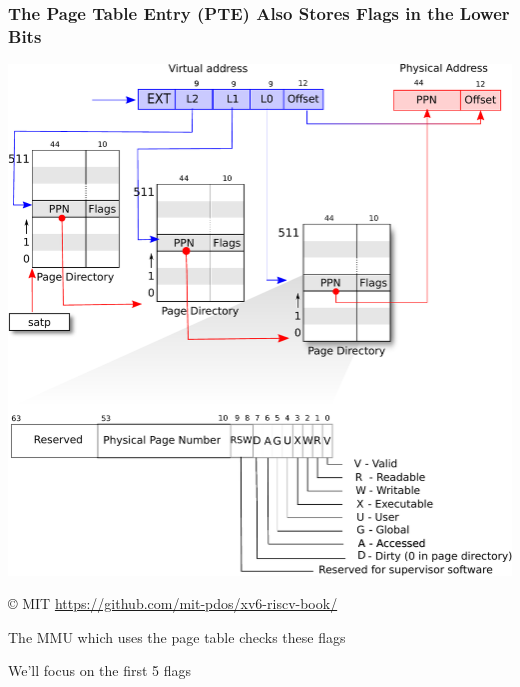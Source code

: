   \begin{frame}
    \frametitle{The Page Table Entry (PTE) Also Stores Flags in the Lower Bits}

    \begin{center}
      \includegraphics[scale=0.5, clip, trim=0cm 0cm 0cm 13cm]{riscv_pagetable.pdf}
    \end{center}

    © MIT \url{https://github.com/mit-pdos/xv6-riscv-book/}

    \vspace{2em}

    The MMU which uses the page table checks these flags

    \hspace{2em} We'll focus on the first 5 flags
  \end{frame}

